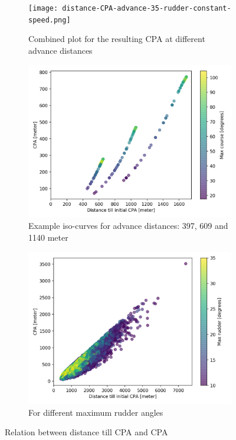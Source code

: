 \begin{figure}[!p]
	\centering
	\begin{subfigure}[b]{0.6\textwidth}
		\texttt{[image: distance-CPA-advance-35-rudder-constant-speed.png]}
		\caption{Combined plot for the resulting CPA at different advance distances}
		\label{fig:distance-CPA-advance}
	\end{subfigure}
	\begin{subfigure}[b]{0.6\linewidth}
		\includegraphics[width=\textwidth]{figure/distsance-CPA-course-50}
		\caption{Example iso-curves for advance distances: 397, 609 and 1140 meter }
		\label{fig:distsance-cpa-course-50}
	\end{subfigure}
	\begin{subfigure}[b]{0.6\textwidth}
		\includegraphics[width=\linewidth]{figure/distance-cpa-max-rudder}
		\caption{For different maximum rudder angles}
		\label{fig:distance-cpa-max-rudder}
	\end{subfigure}
	\caption{Relation between distance till CPA and CPA}
\end{figure}

